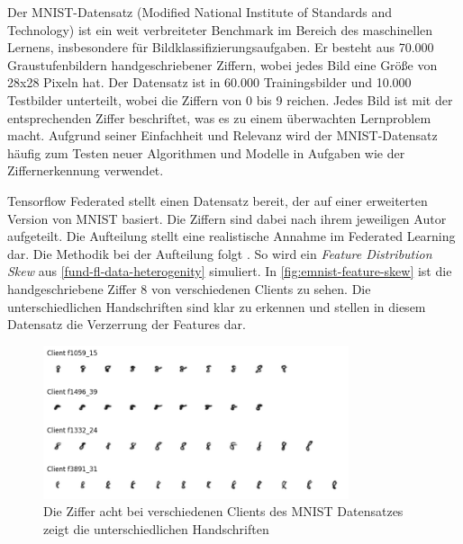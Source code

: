 Der MNIST-Datensatz (Modified National Institute of Standards and Technology) ist ein weit verbreiteter Benchmark im Bereich des maschinellen Lernens, insbesondere für Bildklassifizierungsaufgaben. Er besteht aus 70.000 Graustufenbildern handgeschriebener Ziffern, wobei jedes Bild eine Größe von 28x28 Pixeln hat. Der Datensatz ist in 60.000 Trainingsbilder und 10.000 Testbilder unterteilt, wobei die Ziffern von 0 bis 9 reichen. Jedes Bild ist mit der entsprechenden Ziffer beschriftet, was es zu einem überwachten Lernproblem macht. Aufgrund seiner Einfachheit und Relevanz wird der MNIST-Datensatz häufig zum Testen neuer Algorithmen und Modelle in Aufgaben wie der Ziffernerkennung verwendet.

Tensorflow Federated stellt einen Datensatz bereit, der auf einer erweiterten Version von MNIST basiert. Die Ziffern sind dabei nach ihrem jeweiligen Autor aufgeteilt. Die Aufteilung stellt eine realistische Annahme im Federated Learning dar. Die Methodik bei der Aufteilung folgt \textcite{caldas:2018}. So wird ein \textit{Feature Distribution Skew} aus \autoref{fund-fl-data-heterogenity} simuliert. In \autoref{fig:emnist-feature-skew} ist die handgeschriebene Ziffer 8 von verschiedenen Clients zu sehen. Die unterschiedlichen Handschriften sind klar zu erkennen und stellen in diesem Datensatz die Verzerrung der Features dar.

\begin{figure}[tb]
	\centering
	\includegraphics[width=0.8\textwidth]{Bilder/emnist_feature_distribution_skew.png}
	\caption{Die Ziffer acht bei verschiedenen Clients des MNIST Datensatzes zeigt die unterschiedlichen Handschriften}
	\label{fig:emnist-feature-skew}
\end{figure}

